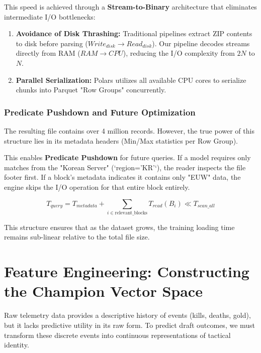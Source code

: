 \documentclass[12pt, a4paper]{article}
\begin{document}
    This speed is achieved through a \textbf{Stream-to-Binary} architecture that eliminates intermediate I/O bottlenecks:
    \begin{enumerate}
        \item \textbf{Avoidance of Disk Thrashing:} Traditional pipelines extract ZIP contents to disk before parsing ($Write_{disk} \rightarrow Read_{disk}$). Our pipeline decodes streams directly from RAM ($RAM \rightarrow CPU$), reducing the I/O complexity from $2N$ to $N$.
        \item \textbf{Parallel Serialization:} Polars utilizes all available CPU cores to serialize chunks into Parquet "Row Groups" concurrently.
    \end{enumerate}

    \subsubsection{Predicate Pushdown and Future Optimization}
    The resulting file contains over 4 million records. However, the true power of this structure lies in its metadata headers (Min/Max statistics per Row Group).

    This enables \textbf{Predicate Pushdown} for future queries. If a model requires only matches from the "Korean Server" (`region='KR'`), the reader inspects the file footer first. If a block's metadata indicates it contains only "EUW" data, the engine skips the I/O operation for that entire block entirely.

    \begin{equation}
        T_{query} = T_{metadata} + \sum_{i \in \text{relevant\_blocks}} T_{read}(B_i) \ll T_{scan\_all}
    \end{equation}

    This structure ensures that as the dataset grows, the training loading time remains sub-linear relative to the total file size.

    \newpage
    \section{Feature Engineering: Constructing the Champion Vector Space}

    Raw telemetry data provides a descriptive history of events (kills, deaths, gold), but it lacks predictive utility in its raw form. To predict draft outcomes, we must transform these discrete events into continuous representations of tactical identity.
\end{document}
